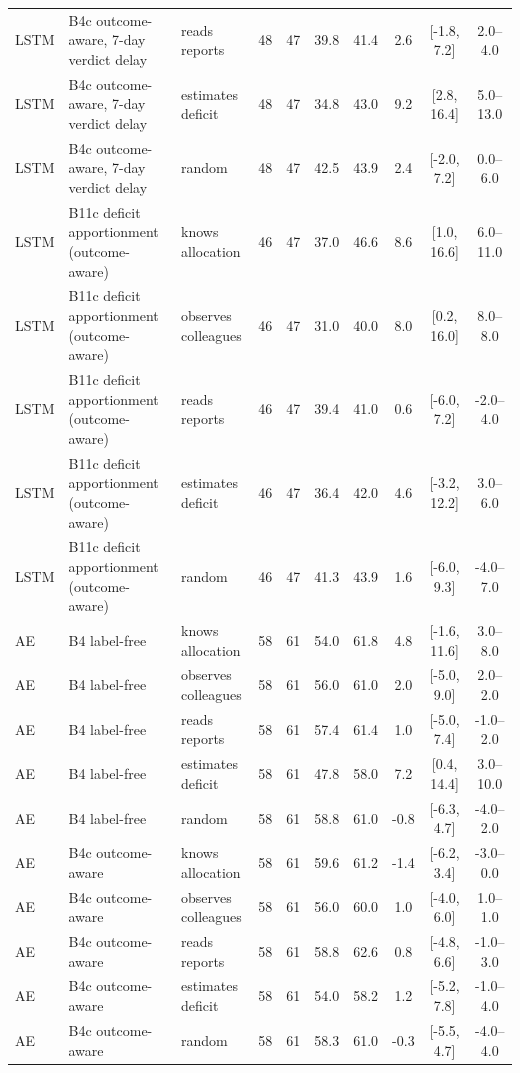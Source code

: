 \begin{table}[!t]
\begin{tabular}{lllccccccc}
LSTM & B4c outcome-aware, 7-day verdict delay & reads reports & 48 & 47 & 39.8 & 41.4 & 2.6 & [-1.8, 7.2] & 2.0--4.0 \\
LSTM & B4c outcome-aware, 7-day verdict delay & estimates deficit & 48 & 47 & 34.8 & 43.0 & 9.2 & [2.8, 16.4] & 5.0--13.0 \\
LSTM & B4c outcome-aware, 7-day verdict delay & random & 48 & 47 & 42.5 & 43.9 & 2.4 & [-2.0, 7.2] & 0.0--6.0 \\
LSTM & B11c deficit apportionment (outcome-aware) & knows allocation & 46 & 47 & 37.0 & 46.6 & 8.6 & [1.0, 16.6] & 6.0--11.0 \\
LSTM & B11c deficit apportionment (outcome-aware) & observes colleagues & 46 & 47 & 31.0 & 40.0 & 8.0 & [0.2, 16.0] & 8.0--8.0 \\
LSTM & B11c deficit apportionment (outcome-aware) & reads reports & 46 & 47 & 39.4 & 41.0 & 0.6 & [-6.0, 7.2] & -2.0--4.0 \\
LSTM & B11c deficit apportionment (outcome-aware) & estimates deficit & 46 & 47 & 36.4 & 42.0 & 4.6 & [-3.2, 12.2] & 3.0--6.0 \\
LSTM & B11c deficit apportionment (outcome-aware) & random & 46 & 47 & 41.3 & 43.9 & 1.6 & [-6.0, 9.3] & -4.0--7.0 \\
AE & B4 label-free & knows allocation & 58 & 61 & 54.0 & 61.8 & 4.8 & [-1.6, 11.6] & 3.0--8.0 \\
AE & B4 label-free & observes colleagues & 58 & 61 & 56.0 & 61.0 & 2.0 & [-5.0, 9.0] & 2.0--2.0 \\
AE & B4 label-free & reads reports & 58 & 61 & 57.4 & 61.4 & 1.0 & [-5.0, 7.4] & -1.0--2.0 \\
AE & B4 label-free & estimates deficit & 58 & 61 & 47.8 & 58.0 & 7.2 & [0.4, 14.4] & 3.0--10.0 \\
AE & B4 label-free & random & 58 & 61 & 58.8 & 61.0 & -0.8 & [-6.3, 4.7] & -4.0--2.0 \\
AE & B4c outcome-aware & knows allocation & 58 & 61 & 59.6 & 61.2 & -1.4 & [-6.2, 3.4] & -3.0--0.0 \\
AE & B4c outcome-aware & observes colleagues & 58 & 61 & 56.0 & 60.0 & 1.0 & [-4.0, 6.0] & 1.0--1.0 \\
AE & B4c outcome-aware & reads reports & 58 & 61 & 58.8 & 62.6 & 0.8 & [-4.8, 6.6] & -1.0--3.0 \\
AE & B4c outcome-aware & estimates deficit & 58 & 61 & 54.0 & 58.2 & 1.2 & [-5.2, 7.8] & -1.0--4.0 \\
AE & B4c outcome-aware & random & 58 & 61 & 58.3 & 61.0 & -0.3 & [-5.5, 4.7] & -4.0--4.0 \\

\end{tabular}
\end{table}
